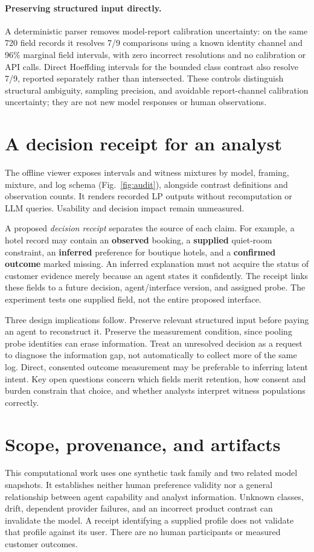 \documentclass[manuscript,review,anonymous]{acmart}
\begin{document}
\paragraph{Preserving structured input directly.}
A deterministic parser removes model-report calibration uncertainty: on the same 720 field records it resolves 7/9 comparisons using a known identity channel and 96\% marginal field intervals, with zero incorrect resolutions and no calibration or API calls. Direct Hoeffding intervals for the bounded class contrast also resolve 7/9, reported separately rather than intersected. These controls distinguish structural ambiguity, sampling precision, and avoidable report-channel calibration uncertainty; they are not new model responses or human observations.

\section{A decision receipt for an analyst}
The offline viewer exposes intervals and witness mixtures by model, framing, mixture, and log schema (Fig.~\ref{fig:audit}), alongside contrast definitions and observation counts. It renders recorded LP outputs without recomputation or LLM queries. Usability and decision impact remain unmeasured.

A proposed \emph{decision receipt} separates the source of each claim. For example, a hotel record may contain an \textbf{observed} booking, a \textbf{supplied} quiet-room constraint, an \textbf{inferred} preference for boutique hotels, and a \textbf{confirmed outcome} marked missing. An inferred explanation must not acquire the status of customer evidence merely because an agent states it confidently. The receipt links these fields to a future decision, agent/interface version, and assigned probe. The experiment tests one supplied field, not the entire proposed interface.

Three design implications follow. Preserve relevant structured input before paying an agent to reconstruct it. Preserve the measurement condition, since pooling probe identities can erase information. Treat an unresolved decision as a request to diagnose the information gap, not automatically to collect more of the same log. Direct, consented outcome measurement may be preferable to inferring latent intent. Key open questions concern which fields merit retention, how consent and burden constrain that choice, and whether analysts interpret witness populations correctly.

\section{Scope, provenance, and artifacts}
This computational work uses one synthetic task family and two related model snapshots. It establishes neither human preference validity nor a general relationship between agent capability and analyst information. Unknown classes, drift, dependent provider failures, and an incorrect product contrast can invalidate the model. A receipt identifying a supplied profile does not validate that profile against its user. There are no human participants or measured customer outcomes.
\end{document}
